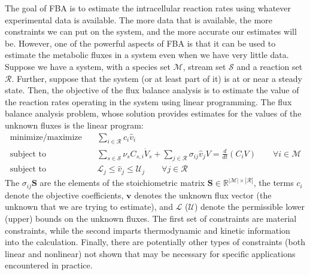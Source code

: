 \documentclass{article}[11pt]
\def\R{\mathbb{R}}
\begin{document}
The goal of FBA is to estimate the intracellular reaction rates using whatever experimental data is available.
The more data that is available, the more constraints we can put on the system, and the more accurate our estimates will be.
However, one of the powerful aspects of FBA is that it can be used to estimate the metabolic fluxes in a system even when we have very little data.
Suppose we have a system, with a species set $\mathcal{M}$, stream set $\mathcal{S}$ and a reaction set $\mathcal{R}$. 
Further, suppose that the system (or at least part of it) is at or near a steady state. 
Then, the objective of the flux balance analysis is to estimate the value of the reaction rates operating in the system using linear programming.
The flux balance analysis problem, whose solution provides estimates for the values of the unknown fluxes is the linear program: 
\begin{eqnarray*}
\text{minimize/maximize}~& & \sum_{i\in\mathcal{R}}c_{i}\hat{v}_{i}\\
\text{subject to} & & \sum_{s\in\mathcal{S}}\nu_{s}C_{s,i}\dot{V}_{s} + \sum_{j\in\mathcal{R}}\sigma_{ij}\hat{v}_{j}V = \frac{d}{dt}\left(C_{i}V\right)\qquad\forall{i\in\mathcal{M}}\\
\text{subject to} & & \mathcal{L}_{j}\leq\hat{v}_{j}\leq\mathcal{U}_{j}\qquad\forall{j\in\mathcal{R}}
\end{eqnarray*}
The $\sigma_{ij}\mathbf{S}$ are the elements of the  stoichiometric matrix $\mathbf{S}\in\R^{|\mathcal{M}|\times|\mathcal{R}|}$, 
the terms $c_{i}$ denote the objective coefficients, 
$\mathbf{v}$ denotes the unknown flux vector (the unknown that we are trying to estimate), and 
$\mathcal{L}$ ($\mathcal{U}$) denote the permissible lower (upper) bounds on the unknown fluxes. 
The first set of constraints are material constraints, 
while the second imparts thermodynamic and kinetic information into the calculation. 
Finally, there are potentially other types of constraints (both linear and nonlinear) not shown 
that may be necessary for specific applications encountered in practice.





\end{document}
